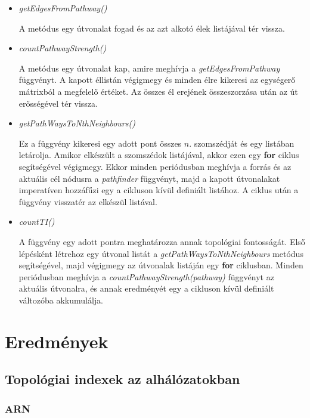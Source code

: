 \documentclass[a4paper,12pt]{article}
\begin{document}
\begin{itemize}
			\item \textit{getEdgesFromPathway()}
			
			A metódus egy útvonalat fogad és az azt alkotó élek listájával tér vissza. 
			
			\pagebreak
			
			\item \textit{countPathwayStrength()}
			
			A metódus egy útvonalat kap, amire meghívja a \textit{getEdgesFromPathway} függvényt. A kapott éllistán végigmegy és minden élre kikeresi az egységerő mátrixból a megfelelő értéket. Az összes él erejének összeszorzása után az út erősségével tér vissza.
			
			\item \textit{getPathWaysToNthNeighbours()}
			
			Ez a függvény kikeresi egy adott pont összes $n$. szomszédját és egy listában letárolja. Amikor elkészült a szomszédok listájával, akkor ezen egy \textbf{for} ciklus segítségével végigmegy. Ekkor minden periódusban meghívja a forrás és az aktuális cél nódusra a \textit{pathfinder} függvényt, majd a kapott útvonalakat imperatíven hozzáfűzi egy a cikluson kívül definiált listához. A ciklus után a függvény visszatér az elkészül listával.
			
			\item \textit{countTI()}
			
			A függvény egy adott pontra meghatározza annak topológiai fontosságát. Első lépésként létrehoz egy útvonal listát a \textit{getPathWaysToNthNeighbours} metódus segítségével, majd végigmegy az útvonalak listáján egy \textbf{for} ciklusban. Minden periódusban meghívja a \textit{countPathwayStrength(pathway)} függvényt az aktuális útvonalra, és annak eredményét egy a cikluson kívül definiált változóba akkumulálja.
			
		\end{itemize}
		\pagebreak


\section{Eredmények}	
	
	\subsection{Topológiai indexek az alhálózatokban}
		\subsubsection{ARN}
	
\end{document}
